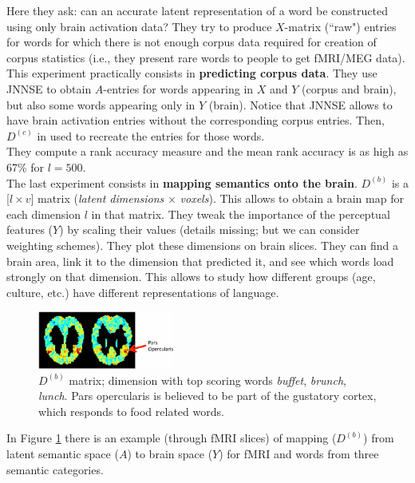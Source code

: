 Here they ask: can an accurate latent representation of a word be constructed using only brain activation data? They try to produce $X$-matrix (``raw") entries for words for which there is not enough corpus data required for creation of corpus statistics (i.e., they present rare words to people to get fMRI/MEG data). This experiment practically consists in \textbf{predicting corpus data}. They use JNNSE to obtain $A$-entries for words appearing in $X$ and $Y$ (corpus and brain), but also some words appearing only in $Y$ (brain). Notice that JNNSE allows to have brain activation entries without the corresponding corpus entries.
Then, $D^{(c)}$ in used to recreate the entries for those words.\\
They compute a rank accuracy measure and the mean rank accuracy is as high as 67\% for $l=500$.\\

The last experiment consists in \textbf{mapping semantics onto the brain}. $D^{(b)}$ is a [$l \times v$] matrix (\textit{latent dimensions} $\times$ \textit{voxels}). This allows to obtain a brain map for each dimension $l$ in that matrix. They tweak the importance of the perceptual features ($Y$) by scaling their values (details missing; but we can consider weighting schemes). They plot these dimensions on brain slices. They can find a brain area, link it to the dimension that predicted it, and see which words load strongly on that dimension. This allows to study how different groups (age, culture, etc.) have different representations of language.

\begin{figure}
  \centering
  \includegraphics[width=0.4\textwidth]{images/jnnse_4.png}
  \caption{$D^{(b)}$ matrix; dimension with top scoring words \textit{buffet}, \textit{brunch}, \textit{lunch}. Pars opercularis is believed to be part of the gustatory cortex, which responds to food related words.}
  \label{fig:jnnse_4}
\end{figure}
In Figure \ref{fig:jnnse_4} there is an example (through fMRI slices) of mapping ($D^{(b)}$) from latent semantic space ($A$) to brain space ($Y$) for fMRI and words from three semantic categories.\\

